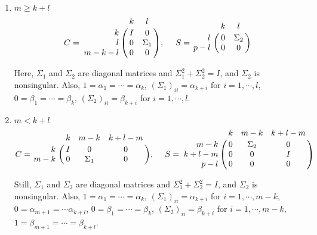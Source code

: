         \begin{enumerate}[\hspace{2em}(1)]
            \item $m \ge k+l$
                \begin{displaymath}
                    C = \bordermatrix{ & k & l  \cr
                    \hfill k & I & 0 \cr
                    \hfill l & 0 & \Sigma_1 \cr
                    m-k-l & 0 & 0}, \  \ \ \
                    S = \bordermatrix{ & k & l \cr
                    \hfill l & 0 & \Sigma_2 \cr
                    \hfill p-l & 0 & 0}
                \end{displaymath}
                
                Here, $\Sigma_1$ and $\Sigma_2$ are diagonal matrices and $\Sigma_1^2 + \Sigma_2^2 = I$, and $\Sigma_2$ is nonsingular. Also, $1 = \alpha_1 =  \cdots = \alpha_k$, $(\Sigma_1)_{ii} = \alpha_{k+i}$ for $i = 1, \cdots, l$, $0 = \beta_1 = \cdots = \beta_k$, $(\Sigma_2)_{ii} = \beta_{k+i}$ for $i = 1, \cdots, l$.
                
            \item $m < k+l$
                \begin{displaymath}
                    C = \bordermatrix{ & k & m-k & k+l-m  \cr
                    \hfill k & I & 0 & 0\cr
                    \hfill m-k & 0 & \Sigma_1 & 0}, \  \ \ \
                    S = \bordermatrix{ & k & m-k & k+l-m \cr
                    \hfill m-k & 0 & \Sigma_2 & 0\cr
                    \hfill k+l-m & 0 & 0 & I\cr
                    \hfill p-l & 0 & 0 & 0}
                \end{displaymath}
                
                Still, $\Sigma_1$ and $\Sigma_2$ are diagonal matrices and $\Sigma_1^2 + \Sigma_2^2 = I$, and $\Sigma_2$ is nonsingular. Also, $1 = \alpha_1 =  \cdots = \alpha_k$, $(\Sigma_1)_{ii} = \alpha_{k+i}$ for $i = 1, \cdots, m-k$, $0 = \alpha_{m+1} = \cdots \alpha_{k+l}$, $0 = \beta_1 = \cdots = \beta_k$, $(\Sigma_2)_{ii} = \beta_{k+i}$ for $i = 1, \cdots, m-k$, $1 = \beta_{m+1} = \cdots = \beta_{k+l}$.
                
        \end{enumerate}
    

